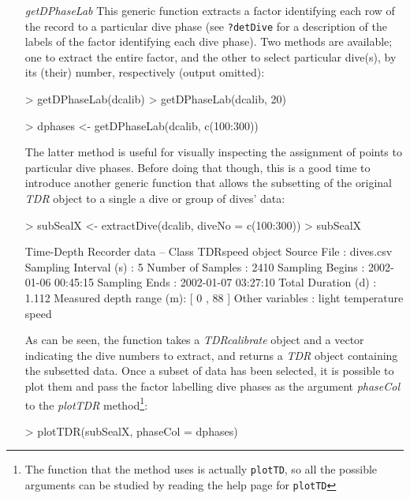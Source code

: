 \documentclass[12pt, letterpaper]{scrartcl}
\newcommand{\Rfunction}[1]{{\texttt{#1}}}
\newcommand{\Rclass}[1]{{\textit{#1}}}
\newcommand{\Rmethod}[1]{{\textit{#1}}}
\newcommand{\Rfunarg}[1]{{\textit{#1}}}
\begin{document}
\begin{itemize}
\item [\Rmethod{getDPhaseLab}] This generic function extracts a factor
  identifying each row of the record to a particular dive phase (see
  \verb|?detDive| for a description of the labels of the factor
  identifying each dive phase).  Two methods are available; one to extract
  the entire factor, and the other to select particular dive(s), by its
  (their) number, respectively (output omitted):
\begin{Schunk}
\begin{Sinput}
> getDPhaseLab(dcalib)
> getDPhaseLab(dcalib, 20)
\end{Sinput}
\end{Schunk}
\begin{Schunk}
\begin{Sinput}
> dphases <- getDPhaseLab(dcalib, c(100:300))
\end{Sinput}
\end{Schunk}
The latter method is useful for visually inspecting the assignment of
points to particular dive phases.  Before doing that though, this is a
good time to introduce another generic function that allows the subsetting
of the original \Rclass{TDR} object to a single a dive or group of dives'
data:
\begin{Schunk}
\begin{Sinput}
> subSealX <- extractDive(dcalib, diveNo = c(100:300))
> subSealX
\end{Sinput}
\begin{Soutput}
Time-Depth Recorder data -- Class TDRspeed object
  Source File             : dives.csv 
  Sampling Interval (s)   : 5 
  Number of Samples       : 2410 
  Sampling Begins         : 2002-01-06 00:45:15 
  Sampling Ends           : 2002-01-07 03:27:10 
  Total Duration (d)      : 1.112 
  Measured depth range (m): [ 0 , 88 ]
  Other variables         : light temperature speed 
\end{Soutput}
\end{Schunk}

As can be seen, the function takes a \Rclass{TDRcalibrate} object and a
vector indicating the dive numbers to extract, and returns a \Rclass{TDR}
object containing the subsetted data.  Once a subset of data has been
selected, it is possible to plot them and pass the factor labelling dive
phases as the argument \Rfunarg{phaseCol} to the \Rmethod{plotTDR}
method\footnote{The function that the method uses is actually
  \Rfunction{plotTD}, so all the possible arguments can be studied by
  reading the help page for \Rfunction{plotTD}}:

\begin{Schunk}
\begin{Sinput}
> plotTDR(subSealX, phaseCol = dphases)
\end{Sinput}
\end{Schunk}

\end{itemize}
\end{document}
